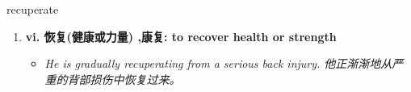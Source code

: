 
\begin{frame}
{\huge recuperate}
\begin{center}
\begin{enumerate}\Large
  \item \textbf{vi. 恢复(健康或力量) ,康复: to recover health or strength}
  \begin{itemize}
    \item \em{\Large{He is gradually recuperating from a serious back injury. 他正渐渐地从严重的背部损伤中恢复过来。}}
  \end{itemize}
\end{enumerate}
\end{center}
\end{frame}
